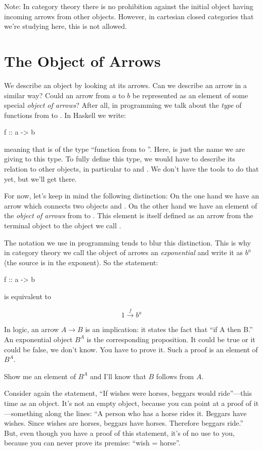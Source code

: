 \documentclass[DaoFP]{subfiles}
\begin{document}
Note: In category theory there is no prohibition against the initial object having incoming arrows from other objects. However, in cartesian closed categories that we're studying here, this is not allowed.

\section{The Object of Arrows}

We describe an object by looking at its arrows. Can we describe an arrow in a similar way? Could an arrow from $a$ to $b$ be represented as an element of some special \emph{object of arrows}? After all, in programming we talk about the \emph{type} of functions from  to . In Haskell we write:
\begin{haskell}
f :: a -> b
\end{haskell}
meaning that  is of the type ``function from  to ''. Here,  is just the name we are giving to this type. To fully define this type, we would have to describe its relation to other objects, in particular to  and . We don't have the tools to do that yet, but we'll get there. 

For now, let's keep in mind the following distinction: On the one hand we have an arrow which connects two objects  and . On the other hand we have an element of the \emph{object of arrows} from   to . This element is itself defined as an arrow from the terminal object \hask{()} to the object we call . 

The notation we use in programming tends to blur this distinction. This is why in category theory we call the object of arrows an \emph{exponential} and write it as $ b^a$ (the source is in the exponent). So the statement:
\begin{haskell}
f :: a -> b
\end{haskell}
is equivalent to

\[ 1 \xrightarrow f b^a\]

In logic, an arrow $ A \to B$ is an implication: it states the fact that ``if A then B.'' An exponential object $ B^A$ is the corresponding proposition. It could be true or it could be false, we don't know. You have to prove it. Such a proof is an element of $ B^A$. 

Show me an element of $ B^A$ and I'll know that $ B$ follows from $ A$.

Consider again the statement, ``If wishes were horses, beggars would ride''---this time as an object. It's not an empty object, because you can point at a proof of it---something along the lines: ``A person who has a horse rides it. Beggars have wishes. Since wishes are horses, beggars have horses. Therefore beggars ride.'' But, even though you have a proof of this statement, it's of no use to you, because you can never prove its premise: ``wish = horse''. 
\end{document}
